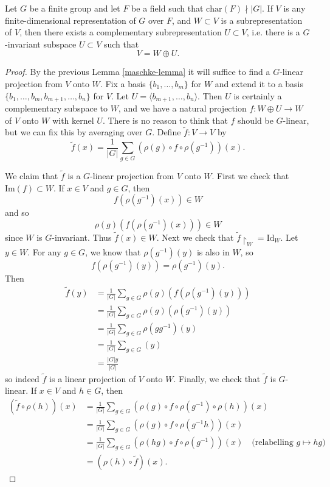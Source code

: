 \begin{thm} \label{maschke}
Let $G$ be a finite group and let $F$ be a field such that $\text{char}(F) \nmid |G|$.  If $V$ is any finite-dimensional representation of $G$ over $F$, and $W \subset V$ is a subrepresentation of $V$, then there exists a complementary subrepresentation $U \subset V$, i.e. there is  a $G$-invariant subspace $U \subset V$ such that 
\[ V = W \oplus U. \]
\end{thm}
\begin{proof}
By the previous Lemma \ref{maschke-lemma} it will suffice to find a $G$-linear projection from $V$ onto $W$.  Fix a basis $\{ b_1, \ldots, b_m \}$ for $W$ and extend it to a basis  $\{ b_1, \ldots, b_m, b_{m+1}, \ldots, b_n \}$ for $V$.  Let $U = \langle b_{m+1}, \ldots, b_n \rangle$.  Then $U$ is certainly a complementary subspace to $W$, and we have a natural projection $f \colon W \oplus U \to W$ of $V$ onto $W$ with kernel $U$.  There is no reason to think that $f$ should be $G$-linear, but we can fix this by averaging over $G$.  Define $\widetilde{f} \colon V \to V$ by
\[\widetilde{f}(x) = \frac{1}{|G|} \sum_{g \in G} (\rho(g) \circ f \circ \rho(g^{-1}))(x). \]

We claim that $\widetilde{f}$ is a $G$-linear projection from $V$ onto $W$.  
First we check that $\text{Im}(f) \subset W$.  If $x \in V$ and $g \in G$, then
\[ f (\rho (g^{-1})(x)) \in W \]
and so
\[ \rho(g) ( f ( \rho( g^{-1})(x))) \in W \]
since $W$ is $G$-invariant.  Thus $\widetilde{f}(x) \in W$.  Next we check that $\widetilde{f} \restriction_{W} = \text{Id}_W$. Let $y \in W$.  For any $g \in G$, we know that $\rho(g^{-1})(y)$ is also in $W$, so
\[ f (\rho(g^{-1})(y)) = \rho (g^{-1})(y).\]
Then
\begin{align*}
\widetilde{f}(y) &=  \frac{1}{|G|} \sum_{g \in G} \rho(g) (f ( \rho(g^{-1})(y))) \\
&=\frac{1}{|G|} \sum_{g \in G} \rho(g) (\rho(g^{-1})(y)) \\
&= \frac{1}{|G|} \sum_{g \in G} \rho(g g^{-1}) (y) \\
&=\frac{1}{|G|} \sum_{g \in G} (y) \\
&= \frac{|G| y} {|G|}
\end{align*}
so indeed $\widetilde{f}$ is a linear projection of $V$ onto $W$.  Finally, we check that $\widetilde{f}$ is $G$-linear.  If $x \in V$ and $h \in G$, then
\begin{align*}
(\widetilde{f} \circ \rho(h))(x) &= \frac{1}{|G|} \sum_{g \in G} (\rho(g) \circ f \circ \rho(g^{-1}) \circ \rho(h))(x) \\
&= \frac{1}{|G|} \sum_{g \in G} (\rho(g) \circ f \circ \rho(g^{-1} h))(x) \\
&=\frac{1}{|G|} \sum_{g \in G} (\rho(hg) \circ f \circ \rho(g^{-1}))(x) \quad \text{(relabelling } g \mapsto hg \text{)} \\
&= (\rho(h) \circ \widetilde{f}) (x).
\end{align*}
\end{proof}

